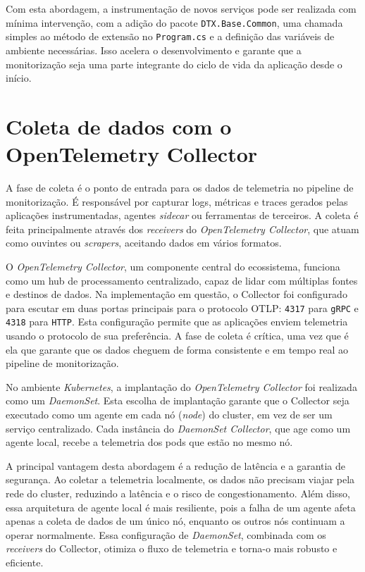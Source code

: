 Com esta abordagem, a instrumentação de novos serviços pode ser realizada com mínima intervenção, com a adição do pacote \texttt{DTX.Base.Common}, uma chamada simples ao método de extensão no \texttt{Program.cs} e a definição das variáveis de ambiente necessárias. Isso acelera o desenvolvimento e garante que a monitorização seja uma parte integrante do ciclo de vida da aplicação desde o início.

\section{Coleta de dados com o OpenTelemetry Collector}

A fase de coleta é o ponto de entrada para os dados de telemetria no pipeline de monitorização. É responsável por capturar logs, métricas e traces gerados pelas aplicações instrumentadas, agentes \textit{sidecar} ou ferramentas de terceiros. A coleta é feita principalmente através dos \textit{receivers} do \textit{OpenTelemetry Collector}, que atuam como ouvintes ou \textit{scrapers}, aceitando dados em vários formatos.

O \textit{OpenTelemetry Collector}, um componente central do ecossistema, funciona como um hub de processamento centralizado, capaz de lidar com múltiplas fontes e destinos de dados. Na implementação em questão, o Collector foi configurado para escutar em duas portas principais para o protocolo OTLP: \texttt{4317} para \texttt{gRPC} e \texttt{4318} para \texttt{HTTP}. Esta configuração permite que as aplicações enviem telemetria usando o protocolo de sua preferência. A fase de coleta é crítica, uma vez que é ela que garante que os dados cheguem de forma consistente e em tempo real ao pipeline de monitorização.

No ambiente \textit{Kubernetes}, a implantação do \textit{OpenTelemetry Collector} foi realizada como um \textit{DaemonSet}. Esta escolha de implantação garante que o Collector seja executado como um agente em cada nó (\textit{node}) do cluster, em vez de ser um serviço centralizado. Cada instância do \textit{DaemonSet Collector}, que age como um agente local, recebe a telemetria dos pods que estão no mesmo nó.

A principal vantagem desta abordagem é a redução de latência e a garantia de segurança. Ao coletar a telemetria localmente, os dados não precisam viajar pela rede do cluster, reduzindo a latência e o risco de congestionamento. Além disso, essa arquitetura de agente local é mais resiliente, pois a falha de um agente afeta apenas a coleta de dados de um único nó, enquanto os outros nós continuam a operar normalmente. Essa configuração de \textit{DaemonSet}, combinada com os \textit{receivers} do Collector, otimiza o fluxo de telemetria e torna-o mais robusto e eficiente.

